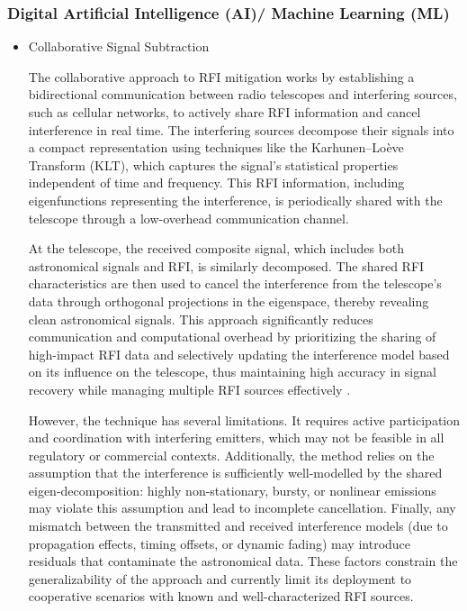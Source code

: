 \subsubsection{Digital Artificial Intelligence (AI)/ Machine Learning (ML)}
\begin{itemize}
\item Collaborative Signal Subtraction

The collaborative approach to RFI mitigation works by establishing a bidirectional communication between radio telescopes and interfering sources, such as cellular networks, to actively share RFI information and cancel interference in real time. The interfering sources decompose their signals into a compact representation using techniques like the Karhunen–Loève Transform (KLT), which captures the signal's statistical properties independent of time and frequency. This RFI information, including eigenfunctions representing the interference, is periodically shared with the telescope through a low-overhead communication channel.

At the telescope, the received composite signal, which includes both astronomical signals and RFI, is similarly decomposed. The shared RFI characteristics are then used to cancel the interference from the telescope’s data through orthogonal projections in the eigenspace, thereby revealing clean astronomical signals. This approach significantly reduces communication and computational overhead by prioritizing the sharing of high-impact RFI data and selectively updating the interference model based on its influence on the telescope, thus maintaining high accuracy in signal recovery while managing multiple RFI sources effectively \citep{chakraborty2023collaboration,chakraborty2024low}.

However, the technique has several limitations. It requires active participation and coordination with interfering emitters, which may not be feasible in all regulatory or commercial contexts. Additionally, the method relies on the assumption that the interference is sufficiently well-modelled by the shared eigen-decomposition: highly non-stationary, bursty, or nonlinear emissions may violate this assumption and lead to incomplete cancellation. Finally, any mismatch between the transmitted and received interference models (due to propagation effects, timing offsets, or dynamic fading) may introduce residuals that contaminate the astronomical data. These factors constrain the generalizability of the approach and currently limit its deployment to cooperative scenarios with known and well-characterized RFI sources.


\end{itemize}
